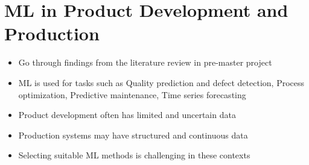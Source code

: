 \section{ML in Product Development and Production}
\begin{itemize}
    \item Go through findings from the literature review in pre-master project
    \item ML is used for tasks such as Quality prediction and defect detection, Process optimization, Predictive maintenance, Time series forecasting
    \item Product development often has limited and uncertain data
    \item Production systems may have structured and continuous data
    \item Selecting suitable ML methods is challenging in these contexts
\end{itemize}